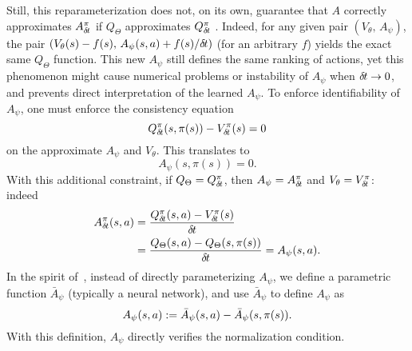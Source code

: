 Still, this reparameterization does not, on its own, guarantee that $A$
correctly approximates $A^\pi_{\delta\hspace{-.1em}t}$ if
$Q_\Theta$ approximates $Q^\pi_{\delta\hspace{-.1em}t}$%
.
Indeed, for any given pair $(V_\theta,\,A_\psi)$, the pair $(V_\theta(s) -
f(s),\,A_\psi(s,a)+f(s)/{\delta\hspace{-.1em}t})$ (for an arbitrary $f$)
yields the exact same $Q_\Theta$ function. This new $A_\psi$ still defines %
the same ranking of actions, yet this phenomenon might cause
numerical problems or instability of $A_\psi$ when ${\delta\hspace{-.1em}t}\to 0$, and prevents direct
interpretation of the learned $A_\psi$.
To enforce identifiability of $A_\psi$, one must enforce the consistency equation
\begin{equation}
	Q^\pi_{\delta\hspace{-.1em}t}(s, \pi(s)) - V^\pi_{\delta\hspace{-.1em}t}(s) = 0
\end{equation}
on the approximate $A_\psi$ and $V_\theta$. This translates to
\begin{equation}
	A_\psi(s, \pi(s)) = 0.
\end{equation}
With this additional constraint, if $Q_\Theta = Q^\pi_{\delta\hspace{-.1em}t}$, then $A_\psi =
A^\pi_{\delta\hspace{-.1em}t}$ and $V_\theta = V^\pi_{\delta\hspace{-.1em}t}$: indeed 
\begin{align}
	A^\pi_{\delta\hspace{-.1em}t}(s, a) &= \frac{Q^\pi_{\delta\hspace{-.1em}t}(s,a) - V^\pi_{\delta\hspace{-.1em}t}(s)}{{\delta\hspace{-.1em}t}}\\
		    &= \frac{Q_\Theta(s,a) - Q_\Theta(s, \pi(s))}{{\delta\hspace{-.1em}t}}
		    = A_\psi(s, a).
\end{align}
In the spirit of~\cite{dueling_nets}, instead of directly parameterizing $A_\psi$,
we define a parametric function $\bar{A}_\psi$ (typically a neural network),
and use $\bar{A}_\psi$ to define $A_\psi$ as
\begin{equation}
\label{eq:Aparam}
	A_\psi(s, a) \mathrel{\mathop{:}}= \bar{A}_\psi(s, a) - \bar{A}_\psi(s, \pi(s)).
\end{equation}
With this definition, $A_\psi$ directly verifies the normalization condition.

